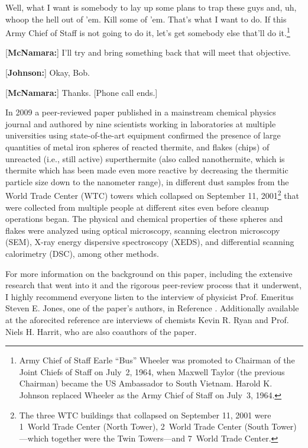 \documentclass[letterpaper,12pt]{article}
\makeatletter
\newcommand{\asterism}{\smash{%
  \raisebox{-.5ex}{%
    \setlength{\tabcolsep}{-.5pt}%
    \begin{tabular}{@{}cc@{}}%
      \multicolumn2c*\\[-2ex]*&*%
    \end{tabular}}}}
\newenvironment{squotation}
  {\small\quotation}
  {\endquotation\normalsize}
\makeatother
\begin{document}
\begin{squotation}
[\textbf{Johnson:}] Well, what I want is somebody to lay up some plans to trap these guys and, uh, whoop the hell out of 'em. Kill some of 'em. That's what I want to do. If this Army Chief of Staff is not going to do it, let's get somebody else that'll do it.\footnote{Army Chief of Staff Earle ``Bus'' Wheeler was promoted to Chairman of the Joint Chiefs of Staff on July~2, 1964, when Maxwell Taylor (the previous Chairman) became the US Ambassador to South Vietnam. Harold K. Johnson replaced Wheeler as the Army Chief of Staff on July~3, 1964.}

[\textbf{McNamara:}] I'll try and bring something back that will meet that objective.

[\textbf{Johnson:}] Okay, Bob.

[\textbf{McNamara:}] Thanks. [Phone call ends.]
\end{squotation}

\vspace{1em}
\centerline{\asterism}
\vspace{1em}

In\label{page:Thermite} 2009 a peer-reviewed paper \cite{HarritEtAl2009} published in a mainstream chemical physics journal and authored by nine scientists working in laboratories at multiple universities using state-of-the-art equipment confirmed the presence of large quantities of metal iron spheres of reacted thermite, and flakes (chips) of unreacted (i.e., still active) superthermite (also called nanothermite, which is thermite which has been made even more reactive by decreasing the thermitic particle size down to the nanometer range), in different dust samples from the World Trade Center (WTC) towers which collapsed on September 11, 2001\footnote{The three WTC buildings that collapsed on September 11, 2001 were 1~World Trade Center (North Tower), 2~World Trade Center (South Tower)---which together were the Twin Towers---and 7~World Trade Center.} that were collected from multiple people at different sites even before cleanup operations began. The physical and chemical properties of these spheres and flakes were analyzed using optical microscopy, scanning electron microscopy (SEM), X-ray energy dispersive spectroscopy (XEDS), and differential scanning calorimetry (DSC), among other methods.

For more information on the background on this paper, including the extensive research that went into it and the rigorous peer-review process that it underwent, I highly recommend everyone listen to the interview of physicist Prof. Emeritus Steven E. Jones, one of the paper's authors, in Reference . Additionally available at the aforecited reference are interviews of chemists Kevin R. Ryan and Prof. Niels H. Harrit, who are also coauthors of the paper.
\end{document}

